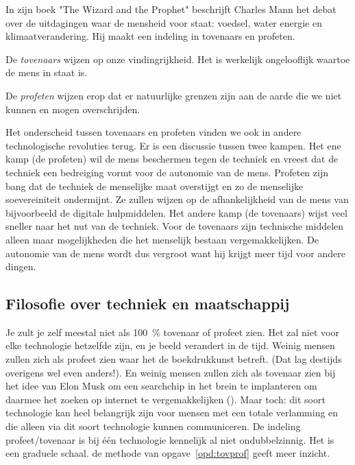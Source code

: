 \documentclass[../../main.tex]{subfiles}
\begin{document}
In zijn boek "The Wizard and the Prophet" \cite{mann2018wizard} beschrijft Charles Mann het debat over de uitdagingen waar de mensheid voor staat: voedsel, water energie en klimaatverandering. Hij maakt een indeling in tovenaars en profeten.

De \textit{tovenaars} wijzen op onze vindingrijkheid. Het is werkelijk ongelooflijk waartoe de mens in staat is. 

De \textit{profeten} wijzen erop dat er natuurlijke grenzen zijn aan de aarde die we niet kunnen en mogen overschrijden.

Het onderscheid tussen tovenaars en profeten vinden we ook in andere technologische revoluties terug. Er is een discussie tussen twee kampen. Het ene kamp (de profeten) wil de mens beschermen tegen de techniek en vreest dat de techniek een bedreiging vormt voor de autonomie van de mens. Profeten zijn bang dat de techniek de menselijke maat overstijgt en zo de menselijke soevereiniteit ondermijnt. Ze zullen wijzen op de afhankelijkheid van de mens van bijvoorbeeld de digitale hulpmiddelen. Het andere kamp (de tovenaars) wijst veel sneller naar het nut van de techniek. Voor de tovenaars zijn technische middelen alleen maar mogelijkheden die het menselijk bestaan vergemakkelijken. De autonomie van de mens wordt dus vergroot want hij krijgt meer tijd voor andere dingen.

\subsection*{Filosofie over techniek en maatschappij}
Je zult je zelf meestal niet als \SI{100}{\percent} tovenaar of profeet zien. Het zal niet voor elke technologie hetzelfde zijn, en je beeld verandert in de tijd. Weinig mensen zullen zich als profeet zien waar het de boekdrukkunst betreft. (Dat lag destijds overigens wel even anders!). En weinig mensen zullen zich als tovenaar zien bij het idee van Elon Musk om een searchchip in het brein te implanteren om daarmee het zoeken op internet te vergemakkelijken (). Maar toch: dit soort technologie kan heel belangrijk zijn voor mensen met een totale verlamming en die alleen via dit soort technologie kunnen communiceren.
De indeling profeet/tovenaar is bij \'e\'en technologie kennelijk al niet ondubbelzinnig. Het is een graduele schaal. de methode van opgave~\ref{opd:tovprof} geeft meer inzicht.
\end{document}
